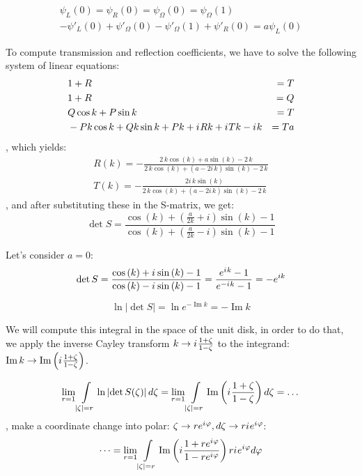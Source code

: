 \documentclass{birkjour}
\theoremstyle{definition}
\theoremstyle{remark}
\numberwithin{equation}{section}
\newcommand{\eexp}[1]{e^{#1}}
\newcommand{\iu}{{i\mkern1mu}}
\renewcommand{\Im}{\operatorname{Im}}
\renewcommand{\phi}{\varphi}
\begin{document}
\begin{align*}
\psi_L(0) = \psi_R(0) = \psi_\Omega(0) = \psi_\Omega(1) \\ 
-\psi'_L(0) + \psi'_\Omega(0) - \psi'_\Omega(1) + \psi'_R(0) = a \psi_L(0)
\end{align*}


To compute transmission and reflection coefficients, we have to solve the following system of linear equations:
\begin{align*}
& 1 + R &= T \\
& 1 + R &= Q \\
& Q \cos k + P \sin k &= T \\
& -P k \cos k + Q k \sin k + P k + \iu R k + \iu T k - \iu k &= T a
\end{align*}
, which yields:
\begin{align*}
R(k) = -\frac{2 \, k \cos\left(k\right) + a \sin\left(k\right) - 2 \, k}{2 \, k \cos\left(k\right) + {\left(a - 2 i \, k\right)} \sin\left(k\right) - 2 \, k} \\
T(k) = -\frac{2 i \, k \sin\left(k\right)}{2 \, k \cos\left(k\right) + {\left(a - 2 i \, k\right)} \sin\left(k\right) - 2 \, k}
\end{align*}
, and after substituting these in the S-matrix, we get:
\[
\det S = 
\frac
{\cos\left(k\right) + {\left(\frac{a}{2 k} + i\right)} \sin\left(k\right) - 1}
{\cos\left(k\right) + {\left(\frac{a}{2 k} - i\right)} \sin\left(k\right) - 1}
\]


Let's consider $a=0$:
\[
\det S
= \frac
{\cos\left(k\right) + \iu \sin\left(k\right) - 1}
{\cos\left(k\right) - \iu \sin\left(k\right) - 1}
= \frac{\eexp{\iu k} - 1}{\eexp{-\iu k} - 1}
= -\eexp{i k}
\]

\[
\ln \left|{\det S}\right| = \ln \eexp{- \Im k} = -\Im k
\]

We will compute this integral in the space of the unit disk, in order to do that, we apply the inverse Cayley transform $k \to \iu \frac{1 + \zeta}{1 - \zeta}$ to the integrand: $\Im k \to \Im \left( \iu \frac{1 + \zeta}{1 - \zeta} \right) $.

\[
  \lim\limits_{r = 1} \int\limits_{\left|\zeta\right| = r} \ln \left|\det S(\zeta)\right| d \zeta
= \lim\limits_{r = 1} \int\limits_{\left|\zeta\right| = r} \Im \left( \iu \frac{1 + \zeta}{1 - \zeta} \right)  d\zeta = \dots
\]
, make a coordinate change into polar: $\zeta \to r \eexp{\iu \phi}, d\zeta \to r \iu \eexp{\iu \phi}$:
\[
\dots = \lim\limits_{r = 1} \int\limits_{\left|\zeta\right| = r} \Im \left( \iu \frac{1 + r \eexp{\iu \phi}}{1 - r \eexp{\iu \phi}} \right) r \iu \eexp{\iu \phi} d\phi
\]
\end{document}

